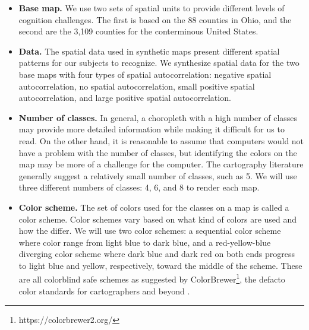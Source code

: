 
\begin{itemize}
    \item {\bf Base map.} We use two sets of spatial units to provide different levels of cognition challenges. The first is based on the 88 counties in Ohio, and the second are the 3,109 counties for the conterminous United States.

    \item {\bf Data.} The spatial data used in synthetic maps present different spatial patterns for our subjects to recognize. We synthesize spatial data for the two base maps with four types of spatial autocorrelation: negative spatial autocorrelation, no spatial autocorrelation, small positive spatial autocorrelation, and large positive spatial autocorrelation.

    \item {\bf Number of classes.} In general, a choropleth with a high number of classes may provide more detailed information while making it difficult for us to read. On the other hand, it is reasonable to assume that computers would not have a problem with the number of classes, but identifying the colors on the map may be more of a challenge for the computer. The cartography literature generally suggest a relatively small number of classes, such as 5. We will use three different numbers of classes: 4, 6, and 8 to render each map.

    \item {\bf Color scheme.} The set of colors used for the classes on a map is called a color scheme. Color schemes vary based on what kind of colors are used and how the differ. We will use two color schemes: a sequential color scheme where color range from light blue to dark blue, and a red-yellow-blue diverging color scheme where dark blue and dark red on both ends progress to light blue and yellow, respectively, toward the middle of the scheme. These are all colorblind safe schemes as suggested by ColorBrewer\footnote{https://colorbrewer2.org/}, the defacto color standards for cartographers and beyond \citep{harrower2003colorbrewer}.
\end{itemize}

